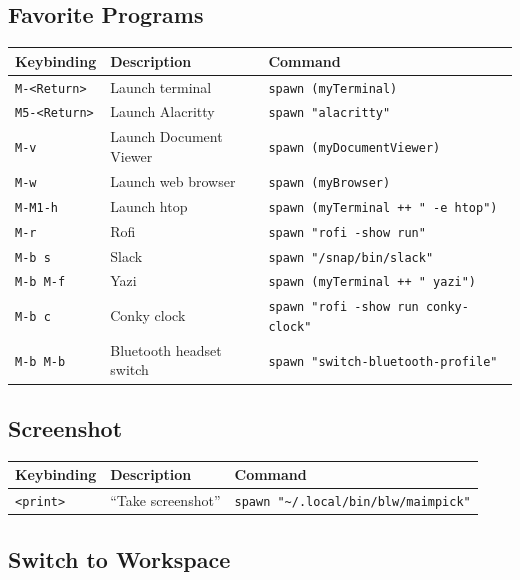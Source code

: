 \hypertarget{favorite-programs}{%
\subsection{Favorite Programs}\label{favorite-programs}}

\begin{longtable}[]{@{}lll@{}}
\toprule
Keybinding & Description & Command \\
\midrule
\endhead
\texttt{M-\textless{}Return\textgreater{}} & Launch terminal &
\texttt{spawn\ (myTerminal)} \\
\texttt{M5-\textless{}Return\textgreater{}} & Launch Alacritty &
\texttt{spawn\ "alacritty"} \\
\texttt{M-v} & Launch Document Viewer &
\texttt{spawn\ (myDocumentViewer)} \\
\texttt{M-w} & Launch web browser & \texttt{spawn\ (myBrowser)} \\
\texttt{M-M1-h} & Launch htop &
\texttt{spawn\ (myTerminal\ ++\ "\ -e\ htop")} \\
\texttt{M-r} & Rofi & \texttt{spawn\ "rofi\ -show\ run"} \\
\texttt{M-b\ s} & Slack & \texttt{spawn\ "/snap/bin/slack"} \\
\texttt{M-b\ M-f} & Yazi & \texttt{spawn\ (myTerminal\ ++\ "\ yazi")} \\
\texttt{M-b\ c} & Conky clock &
\texttt{spawn\ "rofi\ -show\ run\ conky-clock"} \\
\texttt{M-b\ M-b} & Bluetooth headset switch &
\texttt{spawn\ "switch-bluetooth-profile"} \\
\bottomrule
\end{longtable}

\hypertarget{screenshot}{%
\subsection{Screenshot}\label{screenshot}}

\begin{longtable}[]{@{}lll@{}}
\toprule
Keybinding & Description & Command \\
\midrule
\endhead
\texttt{\textless{}print\textgreater{}} & ``Take screenshot'' &
\texttt{spawn\ "\textasciitilde{}/.local/bin/blw/maimpick"} \\
\bottomrule
\end{longtable}

\hypertarget{switch-to-workspace}{%
\subsection{Switch to Workspace}\label{switch-to-workspace}}

